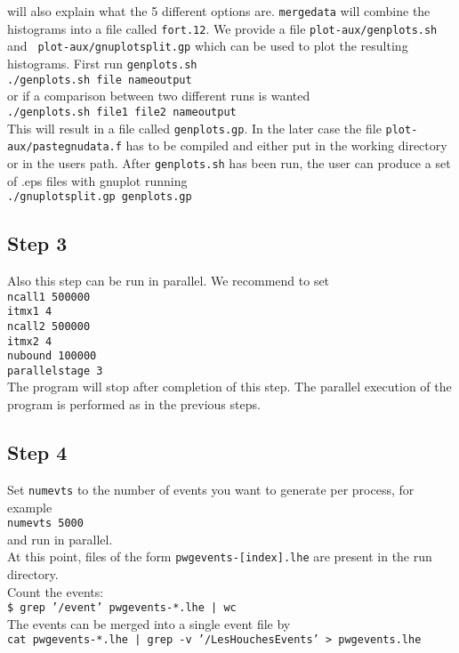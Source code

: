 \documentclass[a4paper,11pt]{article}
\begin{document}
will also explain what the 5 different options are. {\tt mergedata}
will combine the histograms into a file called {\tt fort.12}. We
provide a file {\tt plot-aux/genplots.sh} and {\tt
  plot-aux/gnuplotsplit.gp} which can be used to plot the resulting
histograms. First run {\tt genplots.sh}
\\[2ex]
{\tt ./genplots.sh file nameoutput}
\\[2ex]
or if a comparison between two different runs is wanted
\\[2ex]
{\tt ./genplots.sh file1 file2 nameoutput}
\\[2ex]
This will result in a file called {\tt genplots.gp}. In the later case
the file {\tt plot-aux/pastegnudata.f} has to be compiled and either put
in the working directory or in the users
path. After {\tt genplots.sh} has been run, the user can produce a set
of .eps files with gnuplot running
\\[2ex]
{\tt ./gnuplotsplit.gp genplots.gp}
%
\subsection*{Step 3}
%
Also this step can be run in parallel. 
We recommend to set
\\[2ex]
{\tt ncall1 500000}
\\
{\tt itmx1 4}
\\
{\tt ncall2 500000}
\\
{\tt itmx2 4}
\\
{\tt nubound 100000}
\\
{\tt parallelstage  3}
\\[2ex]
%
The program will stop after
completion of this step.  The parallel execution of the program is
performed as in the previous steps.
%
\subsection*{Step 4}
%
Set {\tt numevts} to the number of events you want to generate per
process, for example
\\[2ex]
{\tt numevts 5000}
\\[2ex]
and run in parallel.  
\\[2ex]
At this point, files of the form {\tt pwgevents-[index].lhe} are
present in the run directory.
\\[2ex]
Count the events:
\\[2ex]
{\tt \$ grep '/event' pwgevents-*.lhe | wc}
\\[2ex]
The events can be merged into a single event file by
\\[2ex]
{\tt cat pwgevents-*.lhe | grep -v '/LesHouchesEvents' >
  pwgevents.lhe}
%
\end{document}
